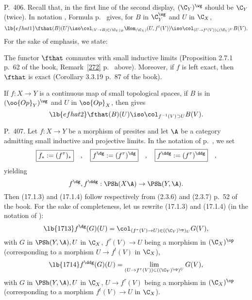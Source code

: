 \documentclass[12pt]{article}
\theoremstyle{remark}
\theoremstyle{definition}
\begin{document}
\begin{s}
P.~406. Recall that, in the first line of the second display, $(\C_Y)^\wg$ should be $\C_Y$ (twice). In notation , Formula  p.~ gives, for $B$ in $\C_Y^\wg$ and $U$ in $\C_X$, 
\begin{equation}\lb{efhat1}
\fthat(B)(U)\iso\col_{(V\to B)\in(\C_Y)_B}\Hom_{(\C_X)}(U,f^t(V))\iso\col_{(U\to f^t(V))\in(\C_Y)^U}B(V).
\end{equation} 
For the sake of emphasis, we state: 
\begin{prop}
The functor $\fthat$ commutes with small inductive limits (Proposition 2.7.1 p.~62 of the book, Remark~\ref{272} p.~ above). Moreover, if $f$ is left exact, then $\fthat$ is exact (Corollary 3.3.19 p.~87 of the book).
\end{prop}

If $f:X\to Y$ is a continuous map of small topological spaces, if $B$ is in $(\oo{Op}_Y)^\wg$ and $U$ in $\oo{Op}_X$, then  gives 
\begin{equation}\lb{efhat2}
\fthat(B)(U)\iso\col_{f^{-1}(V)\supset U}B(V).
\end{equation}
\end{s}

%

\begin{s} 
P.~407. Let $f:X\to Y$ be a morphism of presites and let $\A$ be a category admitting small inductive and projective limits. In the notation of  p.~, we set 
$$
\boxed{f_*:=(f^\tau)_*}\quad,\quad\boxed{f^\dg:=(f^\tau)^\dg}\quad,\quad\boxed{f^\ddg:=(f^\tau)^\ddg}\quad,
$$ 
yielding
$$
f^\dg,f^\ddg:\PSh(X\A)\to\PSh(Y,\A).
$$
Then (17.1.3) and (17.1.4) follow respectively from (2.3.6) and (2.3.7) p.~52 of the book. For the sake of completeness, let us rewrite (17.1.3) and (17.1.4) (in the notation of ): 
\begin{equation}\lb{1713}
f^\dg(G)(U)=\col_{(f^\tau(V)\to U)\in((\C_Y)^{\op})_U}G(V),
\end{equation}
with $G$ in $\PSh(Y,\A),U$ in $\C_X$, $f^\tau(V)\to U$ being a morphism in $(\C_X)^{\op}$ (corresponding to a morphism $U\to f^t(V)$ in $\C_X$), 
\begin{equation}\lb{1714}
f^\ddg(G)(U)=\lim_{(U\to f^\tau(V))\in((\C_Y)^{\op})^U}G(V),
\end{equation} 
with $G$ in $\PSh(Y,\A),U$ in $\C_X$, $U\to f^\tau(V)$ being a morphism in $(\C_X)^{\op}$ (corresponding to a morphism $f^t(V)\to U$ in $\C_X$).
\end{s}
\end{document}
